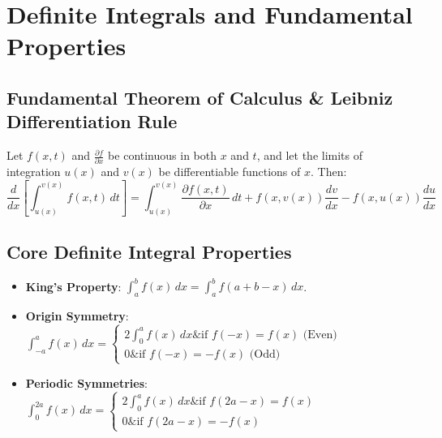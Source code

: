\section{Definite Integrals and Fundamental Properties}

\subsection{Fundamental Theorem of Calculus \& Leibniz Differentiation Rule}

\begin{theorem}
Let $f(x,t)$ and $\frac{\partial f}{\partial x}$ be continuous in both $x$ and $t$, and let the limits of integration $u(x)$ and $v(x)$ be differentiable functions of $x$. Then:
\begin{equation}
    \frac{d}{dx}\left[\int_{u(x)}^{v(x)} f(x,t)\,dt\right] = \int_{u(x)}^{v(x)} \frac{\partial f(x,t)}{\partial x}\,dt + f(x, v(x)) \frac{dv}{dx} - f(x, u(x)) \frac{du}{dx}
\end{equation}
\end{theorem}

\subsection{Core Definite Integral Properties}
\begin{itemize}[leftmargin=1.5em]
    \item \textbf{King's Property}: $\int_a^b f(x)\,dx = \int_a^b f(a+b-x)\,dx$.
    \item \textbf{Origin Symmetry}: $\int_{-a}^a f(x)\,dx = \begin{cases} 2\int_0^a f(x)\,dx \& \text{if } f(-x) = f(x) \text{ (Even)} \\ 0 \& \text{if } f(-x) = -f(x) \text{ (Odd)} \end{cases}$
    \item \textbf{Periodic Symmetries}: $\int_0^{2a} f(x)\,dx = \begin{cases} 2\int_0^a f(x)\,dx \& \text{if } f(2a-x) = f(x) \\ 0 \& \text{if } f(2a-x) = -f(x) \end{cases}$
\end{itemize}

